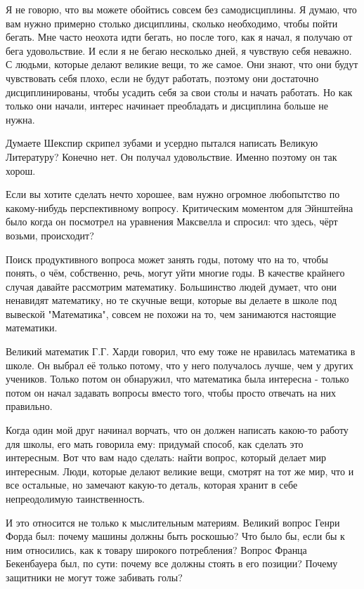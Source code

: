 \documentclass[ebook,12pt,oneside,openany]{memoir}
\begin{document}
Я не говорю, что вы можете обойтись совсем без самодисциплины. Я
думаю, что вам нужно примерно столько дисциплины, сколько необходимо,
чтобы пойти бегать. Мне часто неохота идти бегать, но после того, как
я начал, я получаю от бега удовольствие. И если я не бегаю несколько
дней, я чувствую себя неважно. С людьми, которые делают великие вещи,
то же самое. Они знают, что они будут чувствовать себя плохо, если не
будут работать, поэтому они достаточно дисциплинированы, чтобы усадить
себя за свои столы и начать работать. Но как только они начали,
интерес начинает преобладать и дисциплина больше не нужна.

Думаете Шекспир скрипел зубами и усердно пытался написать Великую
Литературу? Конечно нет. Он получал удовольствие. Именно поэтому он
так хорош.

Если вы хотите сделать нечто хорошее, вам нужно огромное любопытство
по какому-нибудь перспективному вопросу. Критическим моментом для
Эйнштейна было когда он посмотрел на уравнения Максвелла и спросил:
что здесь, чёрт возьми, происходит?

Поиск продуктивного вопроса может занять годы, потому что на то, чтобы
понять, о чём, собственно, речь, могут уйти многие годы. В качестве
крайнего случая давайте рассмотрим математику. Большинство людей
думает, что они ненавидят математику, но те скучные вещи, которые вы
делаете в школе под вывеской "Математика", совсем не похожи на то, чем
занимаются настоящие математики.

Великий математик Г.Г. Харди говорил, что ему тоже не нравилась
математика в школе. Он выбрал её только потому, что у него получалось
лучше, чем у других учеников. Только потом он обнаружил, что
математика была интересна - только потом он начал задавать вопросы
вместо того, чтобы просто отвечать на них правильно.

Когда один мой друг начинал ворчать, что он должен написать какою-то
работу для школы, его мать говорила ему: придумай способ, как сделать
это интересным. Вот что вам надо сделать: найти вопрос, который делает
мир интересным. Люди, которые делают великие вещи, смотрят на тот же
мир, что и все остальные, но замечают какую-то деталь, которая хранит
в себе непреодолимую таинственность.

И это относится не только к мыслительным материям. Великий вопрос
Генри Форда был: почему машины должны быть роскошью? Что было бы, если
бы к ним относились, как к товару широкого потребления? Вопрос Франца
Бекенбауера был, по сути: почему все должны стоять в его позиции?
Почему защитники не могут тоже забивать голы?
\end{document}
